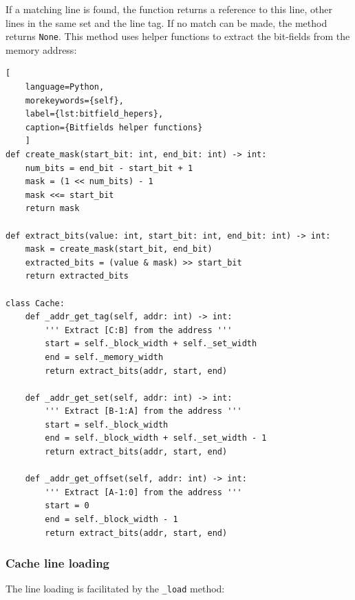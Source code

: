 \noindent If a matching line is found, the function returns a reference to this line, other lines in the same set and the line tag. If no match can be made, the method returns \texttt{None}. This
method uses helper functions to extract the bit-fields from the memory address:


\begin{center}
\centering
\begin{minipage}{\linewidth}
\begin{lstlisting}[
    language=Python,
	morekeywords={self},
    label={lst:bitfield_hepers},
    caption={Bitfields helper functions}
    ]
def create_mask(start_bit: int, end_bit: int) -> int:
    num_bits = end_bit - start_bit + 1
    mask = (1 << num_bits) - 1
    mask <<= start_bit
    return mask

def extract_bits(value: int, start_bit: int, end_bit: int) -> int:
    mask = create_mask(start_bit, end_bit)
    extracted_bits = (value & mask) >> start_bit
    return extracted_bits

class Cache:
    def _addr_get_tag(self, addr: int) -> int:
        ''' Extract [C:B] from the address '''
        start = self._block_width + self._set_width
        end = self._memory_width
        return extract_bits(addr, start, end)
    
    def _addr_get_set(self, addr: int) -> int:
        ''' Extract [B-1:A] from the address '''
        start = self._block_width
        end = self._block_width + self._set_width - 1
        return extract_bits(addr, start, end)
    
    def _addr_get_offset(self, addr: int) -> int:
        ''' Extract [A-1:0] from the address '''
        start = 0
        end = self._block_width - 1
        return extract_bits(addr, start, end)
\end{lstlisting}
\end{minipage}
\end{center}

\subsubsection*{Cache line loading}
\noindent The line loading is facilitated by the \texttt{\_load} method:

